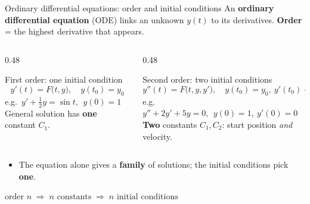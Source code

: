 \documentclass[aspectratio=169]{beamer}
\newcommand{\cbox}[2]{\colorbox{#1}{\ensuremath{\displaystyle #2}}}
\begin{document}
\begin{frame}{Ordinary differential equations: order and initial conditions}
\small
An \textbf{ordinary differential equation} (ODE) links an unknown $y(t)$ to its derivatives.
\textbf{Order} = the highest derivative that appears.

\vspace{0.4em}
\begin{columns}[T]
\begin{column}{0.48\textwidth}
\begin{block}{First order: one initial condition}
\[ y'(t) = F\big(t, y\big), \quad y(t_0) = y_0 \]
\footnotesize
e.g.\ $y' + \tfrac12 y = \sin t,\ \ y(0)=1$\\[2pt]
General solution has \textbf{one} constant $C_1$.
\end{block}
\end{column}
\begin{column}{0.48\textwidth}
\begin{block}{Second order: two initial conditions}
\[ y''(t) = F\big(t, y, y'\big), \quad y(t_0) = y_0,\ y'(t_0) = y'_0 \]
\footnotesize
e.g.\ $y'' + 2y' + 5y = 0,\ \ y(0)=1,\ y'(0)=0$\\[2pt]
\textbf{Two} constants $C_1, C_2$: start position \emph{and} velocity.
\end{block}
\end{column}
\end{columns}

\vspace{0.6em}
\footnotesize
\begin{itemize}
\item The equation alone gives a \textbf{family} of solutions; the initial conditions pick \textbf{one}.
\end{itemize}

\vspace{0.3em}
\centering
\cbox{accent!12}{\text{order } n \;\Rightarrow\; n \text{ constants} \;\Rightarrow\; n \text{ initial conditions}}
\end{frame}
\end{document}
